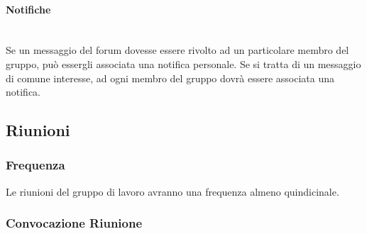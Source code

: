 \paragraph{Notifiche}\mbox{}\\
Se un messaggio del forum dovesse essere rivolto ad un particolare membro del gruppo, può essergli associata una notifica personale. Se si tratta di un messaggio di comune interesse, ad ogni membro del gruppo dovrà essere associata una notifica.

\subsection{Riunioni}

\subsubsection{Frequenza}

Le riunioni del gruppo di lavoro avranno una frequenza almeno quindicinale.

\subsubsection{Convocazione Riunione}
